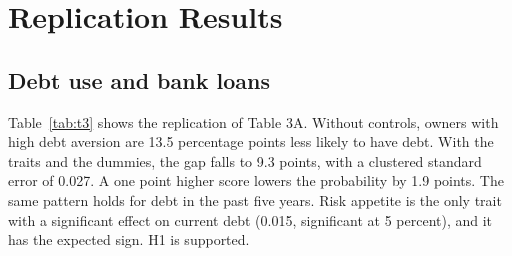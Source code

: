 \documentclass[preprint,letterpaper,11pt,authoryear]{elsarticle}
\begin{document}
\section{Replication Results}

\subsection{Debt use and bank loans}

Table~\ref{tab:t3} shows the replication of Table 3A. Without controls, owners with high debt aversion are 13.5 percentage points less likely to have debt. With the traits and the dummies, the gap falls to 9.3 points, with a clustered standard error of 0.027. A one point higher score lowers the probability by 1.9 points. The same pattern holds for debt in the past five years. Risk appetite is the only trait with a significant effect on current debt (0.015, significant at 5 percent), and it has the expected sign. H1 is supported.
\end{document}
